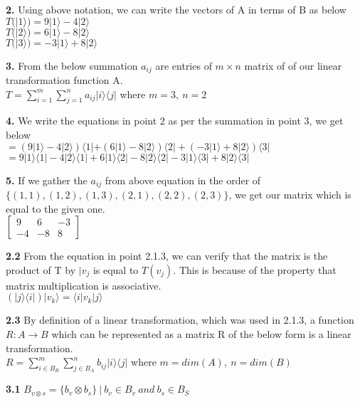 \documentclass [12pt]{article}
\theoremstyle{definition}
\begin{document}
\phantom{1em} {\bf 2.}  Using above notation, we can write the vectors of A in terms of B as below\\
\phantom{1000em} $T(|1\rangle) = 9|1\rangle - 4|2\rangle$\\
\phantom{1000em} $T(|2\rangle) = 6|1\rangle - 8|2\rangle$\\
\phantom{1000em} $T(|3\rangle) = -3|1\rangle + 8|2\rangle$

\phantom{1em} {\bf 3.} From the below summation $a_{ij}$ are entries of $m \times n$ matrix of of our linear transformation function A. \\
\phantom{1000em} $T = \sum\limits_{i=1}^m\sum\limits_{j=1}^n a_{ij} |i \rangle \langle j| $ where $m=3, \ n=2$

\phantom{1em} {\bf 4.} We write the equations in point 2 as per the summation in point 3, we get below\\
\phantom{1000em} $= (9|1\rangle - 4|2\rangle)\langle 1| + (6|1\rangle - 8|2\rangle)\langle 2| + (-3|1\rangle + 8|2\rangle)\langle 3|$\\
\phantom{1000em} $= 9|1 \rangle \langle 1| - 4|2 \rangle \langle 1| +6|1 \rangle \langle 2| -8|2 \rangle \langle 2| -3|1 \rangle \langle 3| +8|2 \rangle \langle 3|$

\phantom{1em} {\bf 5.} If we gather the $a_{ij}$ from above equation in the order of $\{(1,1),(1,2),(1,3),(2,1),(2,2),(2,3)\}$, we get our matrix which is equal to the given one.\\
\phantom{1000em} $\begin{bmatrix} 9 & 6 & -3 \\ -4 & -8 & 8\end{bmatrix}$

\newpage

{\bf 2.2} From the equation in point 2.1.3, we can verify that the matrix is the product of T by $|v_{j}$ is equal to $T(v_{j})$. This is because of the property  that matrix multiplication is associative.\\
\phantom{1000em} $(|j \rangle \langle i|)|v_{k} \rangle = \langle i|v_{k}|j \rangle$

{\bf 2.3} By definition of a linear transformation, which was used in 2.1.3, a function $R : A \rightarrow B$ which can be represented as a matrix R of the below form is a linear transformation.\\
\phantom{1000em} $R = \sum\limits_{i \in B_{B}}^m\sum\limits_{j \in B_{A}}^n b_{ij} |i \rangle \langle j| $ where $m=dim(A), \ n=dim(B)$

{\bf 3.1} $B_{v \otimes s} = \{ b_{v} \otimes b_{s}\} \ | \ b_{v} \in B_{v} \ and \ b_{s} \in B_{S}$
\end{document}
